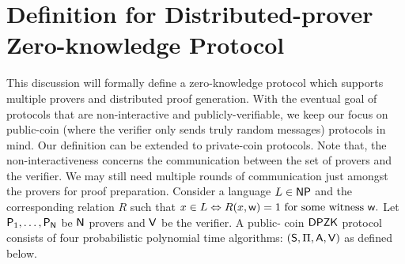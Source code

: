 \section{Definition for Distributed-prover Zero-knowledge Protocol}\label{sec:security model}
This discussion will formally define a zero-knowledge protocol which supports multiple provers and distributed proof generation. With the eventual goal of protocols that are non-interactive  and publicly-verifiable,  we keep our focus on  public-coin (where the verifier only sends truly random messages) protocols in mind.  Our definition can be extended to private-coin protocols. Note that, the non-interactiveness concerns the communication between the set of provers and the verifier. We may still need multiple rounds of communication just amongst the provers for proof preparation.  Consider a language $L \in \mathsf{NP}$ and the corresponding relation $R$ such that
$
{x} \in L \Leftrightarrow R({x}, \mathsf{w})=1 \text{ for some witness } \mathsf{w}.
$
Let $\mathsf{P}_1, \ldots, \mathsf{P}_{\mathsf{N}}$ be $\mathsf{N}$ provers and $\mathsf{V}$ be the verifier. %
A public- coin $\mathsf{DPZK}$ protocol consists of four probabilistic polynomial time algorithms: $(\mathsf{S}, \Pi, \mathsf{A}, \mathsf{V})$ as defined below. 
